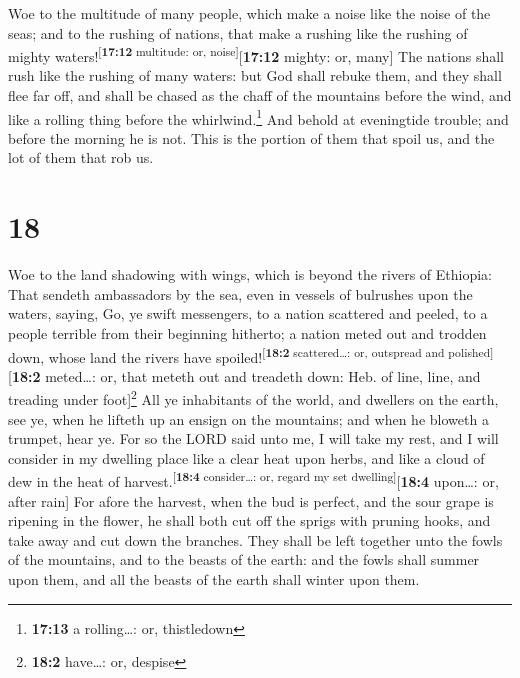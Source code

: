  Woe to the multitude of many people, which make a noise
like the noise of the seas; and to the rushing of nations, that make a
rushing like the rushing of mighty
waters!\textsuperscript{{[}\textbf{17:12} multitude: or,
noise{]}}{[}\textbf{17:12} mighty: or, many{]}  The
nations shall rush like the rushing of many waters: but God shall rebuke
them, and they shall flee far off, and shall be chased as the chaff of
the mountains before the wind, and like a rolling thing before the
whirlwind.\footnote{\textbf{17:13} a rolling\ldots: or, thistledown}
 And behold at eveningtide trouble; and before the
morning he is not. This is the portion of them that spoil us, and the
lot of them that rob us.

\hypertarget{section-17}{%
\section{18}\label{section-17}}

 Woe to the land shadowing with wings, which is beyond the
rivers of Ethiopia:  That sendeth ambassadors by the sea,
even in vessels of bulrushes upon the waters, saying, Go, ye swift
messengers, to a nation scattered and peeled, to a people terrible from
their beginning hitherto; a nation meted out and trodden down, whose
land the rivers have spoiled!\textsuperscript{{[}\textbf{18:2}
scattered\ldots: or, outspread and polished{]}}{[}\textbf{18:2}
meted\ldots: or, that meteth out and treadeth down: Heb. of line, line,
and treading under foot{]}\footnote{\textbf{18:2} have\ldots: or,
  despise}  All ye inhabitants of the world, and dwellers
on the earth, see ye, when he lifteth up an ensign on the mountains; and
when he bloweth a trumpet, hear ye.  For so the LORD said
unto me, I will take my rest, and I will consider in my dwelling place
like a clear heat upon herbs, and like a cloud of dew in the heat of
harvest.\textsuperscript{{[}\textbf{18:4} consider\ldots: or, regard my
set dwelling{]}}{[}\textbf{18:4} upon\ldots: or, after rain{]}
 For afore the harvest, when the bud is perfect, and the
sour grape is ripening in the flower, he shall both cut off the sprigs
with pruning hooks, and take away and cut down the branches.
 They shall be left together unto the fowls of the
mountains, and to the beasts of the earth: and the fowls shall summer
upon them, and all the beasts of the earth shall winter upon them.

